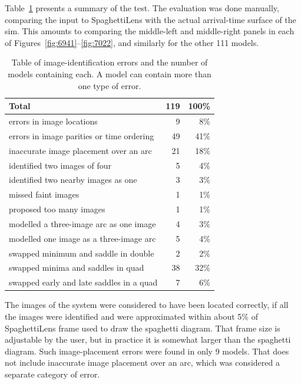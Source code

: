 \documentclass[usenatbib]{mn2e}
\newcommand{\spl}{SpaghettiLens\xspace}
\newcommand{\tabref}[1]{Table~\ref{tab:#1}}
\begin{document}
\tabref{stats} presents a summary of the test.  The evaluation was
done manually, comparing the input to \spl with the actual
arrival-time surface of the sim.  This amounts to comparing the
middle-left and middle-right panels in each of
Figures~\ref{fig:6941}--\ref{fig:7022}, and similarly for the other 111
models.

\begin{table}\centering\begin{tabular}{lrr}\hline
    Total                                                     & 119        & 100\%        \\
\hline
    errors in image locations          &     9         &    8\%            \\
    errors in image parities or time ordering     &    49     &    41\%     \\
\hline
    inaccurate image placement over an arc     &    21    &    18\%     \\
    identified two images of four                         &     5    &     4\% \\
    identified two nearby images as one & 3  & 3\%     \\
    missed faint images &   1   &  1\%     \\
    proposed too many images &  1  &  1\%    \\
    modelled a three-image arc as one image  &  4  &   3\%   \\
    modelled one image as a three-image arc  &  5  &   4\%   \\
    swapped minimum and saddle in double       &  2  &    2\%   \\
    swapped minima and saddles in quad            & 38 & 32\%   \\
    swapped early and late saddles in a quad &   7 &   6\%    \\
\hline
\end{tabular}
\caption{Table of image-identification errors and the number of models
  containing each.  A model can contain more than one type of error.}
\label{tab:stats}
\end{table}

The images of the system were considered to have been located
correctly, if all the images were identified and were approximated
within about 5\% of \spl frame used to draw the spaghetti diagram.
That frame size is adjustable by the user, but in practice it is
somewhat larger than the spaghetti diagram.  Such image-placement
errors were found in only 9 models.  That does not include inaccurate
image placement over an arc, which was considered a separate category
of error.
\end{document}
